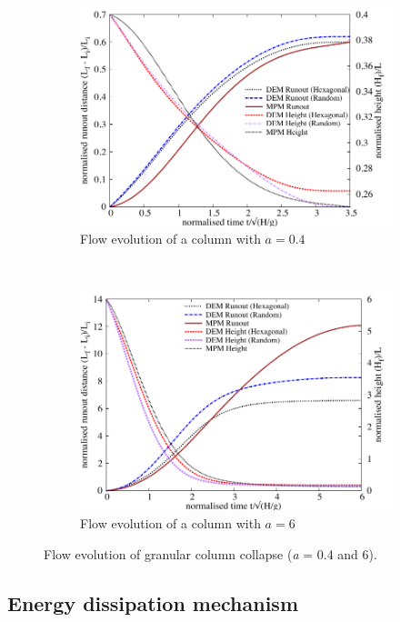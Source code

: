 \begin{figure}[tbhp]
\centering
\begin{subfigure}[b]{0.9\textwidth}
\centering
\includegraphics[width=\textwidth]{flowa04}
\caption{Flow evolution of a column with $a=0.4$}
\label{fig:flowa04}
\end{subfigure}
\\
\begin{subfigure}[b]{0.9\textwidth}
\centering
\includegraphics[width=\textwidth]{flowa6}
\caption{Flow evolution of a column with $a=6$}
\label{fig:flowa6}
\end{subfigure}
\caption{Flow evolution of granular column collapse (\textit{a} = 0.4 and 6).}
\label{fig:flow_column}
\end{figure}

\subsection{Energy dissipation mechanism}
\label{sec:energy}

